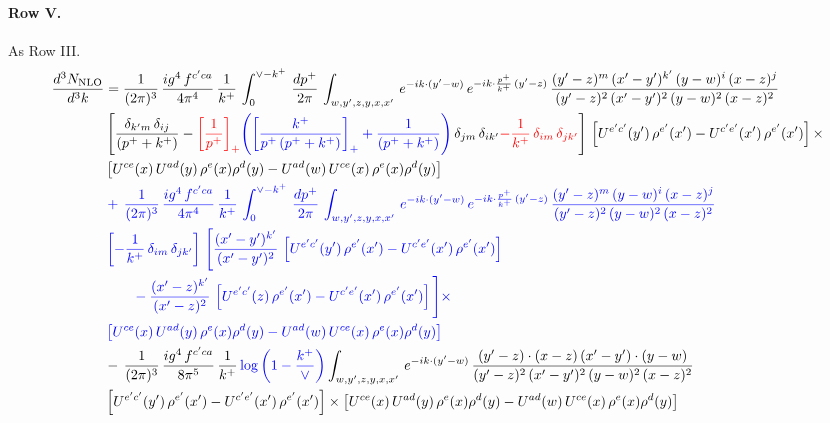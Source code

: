 \documentclass[10pt]{article}
\numberwithin{equation}{section}
\newcommand{\new}[1]{{\color{blue}#1}}
\newcommand{\old}[1]{{\color{red}#1}}
\newcommand{\nc}{\color{blue}}
\begin{document}
\paragraph{Row V.}
As Row III.
\begin{align}
    \frac{d^{3}N_{\rm NLO}}{d^{3}k} & =  \frac{1}{(2\pi)^{3}}\, \frac{ig^{4}\,f^{c'ca}}{4\pi^{4}}\, \frac{1}{k^{+}}\,\int_{0}^{\vee-k^{+}}\, \frac{dp^{+}}{2\pi}\, \int_{w,y',z,y,x,x'}\, e^{-ik\cdot (y'-w)}\, e^{-ik\cdot \frac{p^{+}}{k^{+}}\,(y'-z)}\,\frac{(y'-z)^{m}\,(x'-y')^{k'}\,(y-w)^{i}\,(x-z)^{j}}{(y'-z)^{2}\,(x'-y')^{2}\,(y-w)^{2}\,(x-z)^{2}}\notag \\ & \left[\frac{\delta_{k'm}\,\delta_{ij}}{(p^{+}+k^{+})}-\old{\left[\frac{1}{p^{+}}\right]_{+}}\new{\left(\left[\frac{k^{+}}{p^{+}\,(p^{+}+k^{+})}\right]_{+}+\frac{1}{(p^{+}+k^{+})}\right)}\,\delta_{jm}\,\delta_{ik'}\old{-\frac{1}{k^{+}}\, \delta_{im}\, \delta_{jk'}}\right]\, \left[U^{e'c'}(y')\,\rho^{e'}(x')-U^{c'e'}(x')\,\rho^{e'}(x')\right]\times \notag \\ &  \left[U^{ce}(x)\,U^{ad}(y)\,\rho^{e}(x)\rho^{d}(y)-U^{ad}(w)\,U^{ce}(x)\,\rho^{e}(x)\rho^{d}(y)\right] \notag \\
& \nc  +\,\frac{1}{(2\pi)^{3}}\, \frac{ig^{4}\,f^{c'ca}}{4\pi^{4}}\, \frac{1}{k^{+}}\,\int_{0}^{\vee-k^{+}}\, \frac{dp^{+}}{2\pi}\, \int_{w,y',z,y,x,x'}\, e^{-ik\cdot (y'-w)}\, e^{-ik\cdot \frac{p^{+}}{k^{+}}\,(y'-z)}\,\frac{(y'-z)^{m}\,(y-w)^{i}\,(x-z)^{j}}{(y'-z)^{2}\,(y-w)^{2}\,(x-z)^{2}}\notag \\ & \nc  \left[-\frac{1}{k^{+}}\, \delta_{im}\, \delta_{jk'}\right]\, \Bigg[\frac{(x'-y')^{k'}}{(x'-y')^{2}}\,\left[U^{e'c'}(y')\,\rho^{e'}(x')-U^{c'e'}(x')\,\rho^{e'}(x')\right]\notag \\ & \nc  \qquad-\frac{(x'-z)^{k'}}{(x'-z)^{2}}\,\left[U^{e'c'}(z)\,\rho^{e'}(x')-U^{c'e'}(x')\,\rho^{e'}(x')\right]\Bigg]\times \notag \\ & \nc   \left[U^{ce}(x)\,U^{ad}(y)\,\rho^{e}(x)\rho^{d}(y)-U^{ad}(w)\,U^{ce}(x)\,\rho^{e}(x)\rho^{d}(y)\right] \notag \\
& -\,\frac{1}{(2\pi)^{3}}\, \frac{ig^{4}\,f^{c'ca}}{8\pi^{5}}\, \frac{1}{k^{+}}\,\new{\log{\left(1-\frac{k^{+}}{\vee}\right)}} \int_{w,y',z,y,x,x'}\, e^{-ik\cdot (y'-w)}\,\frac{(y'-z)\cdot (x-z)\,(x'-y')\cdot (y-w)}{(y'-z)^{2}\,(x'-y')^{2}\,(y-w)^{2}\,(x-z)^{2}}\notag \\ & \left[U^{e'c'}(y')\,\rho^{e'}(x')-U^{c'e'}(x')\,\rho^{e'}(x')\right]\times  \left[U^{ce}(x)\,U^{ad}(y)\,\rho^{e}(x)\rho^{d}(y)-U^{ad}(w)\,U^{ce}(x)\,\rho^{e}(x)\rho^{d}(y)\right] \label{eq:F:G3V}
\end{align}
\end{document}
